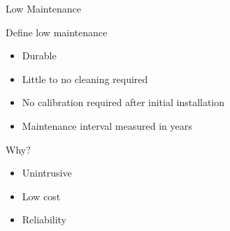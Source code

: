 \begin{frame}{Low Maintenance}
	\begin{block}{Define low maintenance}
	\begin{itemize}
		\item Durable
		\item Little to no cleaning required
		\item No calibration required after initial installation
		\item Maintenance interval measured in years
	\end{itemize}
	\end{block}
	\begin{block}{Why?}
	\begin{itemize}
		\item Unintrusive
		\item Low cost
		\item Reliability\cite{phillips1993}
	\end{itemize}
	\end{block}
\end{frame}
